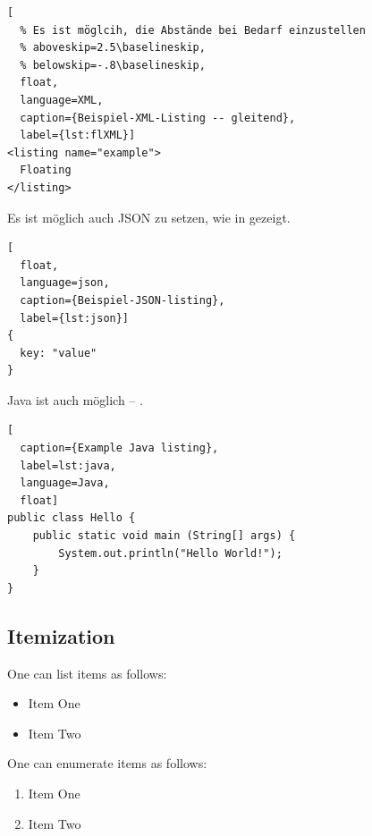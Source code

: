 \begin{ltgexample}
\begin{lstlisting}[
  % Es ist möglcih, die Abstände bei Bedarf einzustellen
  % aboveskip=2.5\baselineskip,
  % belowskip=-.8\baselineskip,
  float,
  language=XML,
  caption={Beispiel-XML-Listing -- gleitend},
  label={lst:flXML}]
<listing name="example">
  Floating
</listing>
\end{lstlisting}
\end{ltgexample}

Es ist möglich auch JSON zu setzen, wie in  gezeigt.

\begin{ltgexample}
\begin{lstlisting}[
  float,
  language=json,
  caption={Beispiel-JSON-listing},
  label={lst:json}]
{
  key: "value"
}
\end{lstlisting}
\end{ltgexample}

Java ist auch möglich -- .

\begin{ltgexample}
\begin{lstlisting}[
  caption={Example Java listing},
  label=lst:java,
  language=Java,
  float]
public class Hello {
    public static void main (String[] args) {
        System.out.println("Hello World!");
    }
}
\end{lstlisting}
\end{ltgexample}

\subsection{Itemization}

One can list items as follows:

\begin{ltgexample}
\begin{itemize}
  \item Item One
  \item Item Two
\end{itemize}
\end{ltgexample}


One can enumerate items as follows:

\begin{ltgexample}
\begin{enumerate}
  \item Item One
  \item Item Two
\end{enumerate}
\end{ltgexample}


